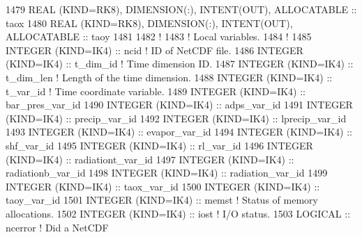 \begin{DoxyCode}
1479     \textcolor{keywordtype}{REAL (KIND=RK8)}, \textcolor{keywordtype}{DIMENSION(:)}, \textcolor{keywordtype}{INTENT(OUT)}, \textcolor{keywordtype}{ALLOCATABLE}             :: taox
1480     \textcolor{keywordtype}{REAL (KIND=RK8)}, \textcolor{keywordtype}{DIMENSION(:)}, \textcolor{keywordtype}{INTENT(OUT)}, \textcolor{keywordtype}{ALLOCATABLE}             :: taoy
1481 
1482     \textcolor{comment}{!}
1483     \textcolor{comment}{! Local variables.}
1484     \textcolor{comment}{!}
1485     \textcolor{keywordtype}{INTEGER (KIND=IK4)}          :: ncid                                                 \textcolor{comment}{! ID of NetCDF
       file.}
1486     \textcolor{keywordtype}{INTEGER (KIND=IK4)}          :: t\_dim\_id                                             \textcolor{comment}{! Time dimension
       ID.}
1487     \textcolor{keywordtype}{INTEGER (KIND=IK4)}          :: t\_dim\_len                                            \textcolor{comment}{! Length of the
       time dimension.}
1488     \textcolor{keywordtype}{INTEGER (KIND=IK4)}          :: t\_var\_id                                             \textcolor{comment}{! Time coordinate
       variable.}
1489     \textcolor{keywordtype}{INTEGER (KIND=IK4)}          :: bar\_pres\_var\_id
1490     \textcolor{keywordtype}{INTEGER (KIND=IK4)}          :: adps\_var\_id
1491     \textcolor{keywordtype}{INTEGER (KIND=IK4)}          :: precip\_var\_id
1492     \textcolor{keywordtype}{INTEGER (KIND=IK4)}          :: lprecip\_var\_id
1493     \textcolor{keywordtype}{INTEGER (KIND=IK4)}          :: evapor\_var\_id
1494     \textcolor{keywordtype}{INTEGER (KIND=IK4)}          :: shf\_var\_id
1495     \textcolor{keywordtype}{INTEGER (KIND=IK4)}          :: rl\_var\_id
1496     \textcolor{keywordtype}{INTEGER (KIND=IK4)}          :: radiationt\_var\_id
1497     \textcolor{keywordtype}{INTEGER (KIND=IK4)}          :: radiationb\_var\_id
1498     \textcolor{keywordtype}{INTEGER (KIND=IK4)}          :: radiation\_var\_id
1499     \textcolor{keywordtype}{INTEGER (KIND=IK4)}          :: taox\_var\_id
1500     \textcolor{keywordtype}{INTEGER (KIND=IK4)}          :: taoy\_var\_id
1501     \textcolor{keywordtype}{INTEGER (KIND=IK4)}          :: memst                                                \textcolor{comment}{! Status of memory
       allocations.}
1502     \textcolor{keywordtype}{INTEGER (KIND=IK4)}          :: iost                                                 \textcolor{comment}{! I/O status.}
1503     \textcolor{keywordtype}{LOGICAL}                     :: ncerror                                              \textcolor{comment}{! Did a NetCDF
}
\end{DoxyCode}

